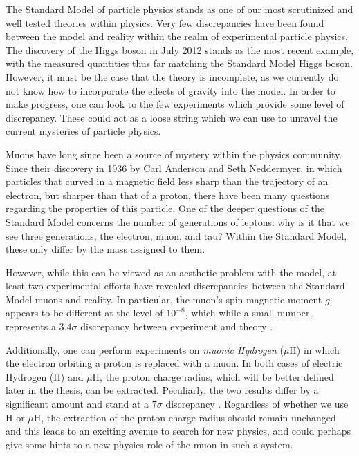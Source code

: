 \label{chapter:introduction}

The Standard Model of particle physics stands as one of our most scrutinized and well tested theories within physics. Very few discrepancies have been found between the model and reality within the realm of experimental particle physics. The discovery of the Higgs boson in July 2012 stands as the most recent example, with the measured quantities thus far matching the Standard Model Higgs boson. However, it must be the case that the theory is incomplete, as we currently do not know how to incorporate the effects of gravity into the model. In order to make progress, one can look to the few experiments which provide some level of discrepancy. These could act as a loose string which we can use to unravel the current mysteries of particle physics.

Muons have long since been a source of mystery within the physics community. Since their discovery in 1936 by Carl Anderson and Seth Neddermyer, in which particles that curved in a magnetic field less sharp than the trajectory of an electron, but sharper than that of a proton, there have been many questions regarding the properties of this particle. One of the deeper questions of the Standard Model concerns the number of generations of leptons: why is it that we see three generations, the electron, muon, and tau? Within the Standard Model, these only differ by the mass assigned to them.

However, while this can be viewed as an aesthetic problem with the model, at least two experimental efforts have revealed discrepancies between the Standard Model muons and reality. In particular, the muon's spin magnetic moment $g$ appears to be different at the level of $10^{-8}$, which while a small number, represents a $3.4\sigma$ discrepancy between experiment and theory \cite{2007PhLB..649..173H}.

Additionally, one can perform experiments on \emph{muonic Hydrogen} ($\mu\textrm{H}$) in which the electron orbiting a proton is replaced with a muon. In both cases of electric Hydrogen (H) and $\mu\textrm{H}$, the proton charge radius, which will be better defined later in the thesis, can be extracted. Peculiarly, the two results differ by a significant amount  and stand at a $7\sigma$ discrepancy \cite{Carlson:2015jba}. Regardless of whether we use H or $\mu\textrm{H}$, the extraction of the proton charge radius should remain unchanged and this leads to an exciting avenue to search for new physics, and could perhaps give some hints to a new physics role of the muon in such a system.


